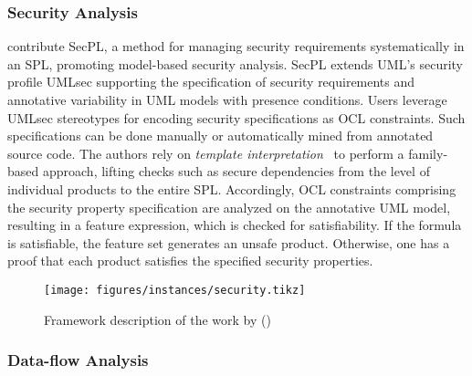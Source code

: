 \subsubsection{Security Analysis}
\label{sec:instance-security}

\citet{securityGPCE18} contribute SecPL, a method for managing security requirements systematically in an SPL, promoting model-based security analysis. SecPL extends UML's security profile UMLsec supporting the specification of security requirements and annotative variability in UML models with presence conditions. Users leverage UMLsec stereotypes for encoding security specifications as OCL constraints. Such specifications can be done manually  or automatically mined from annotated source code. The authors rely on \textit{template interpretation}~\citep{templateInterpretation} to perform a family-based approach, lifting checks such as secure dependencies from the level of individual products to the entire SPL. Accordingly, OCL constraints comprising the security property specification are analyzed on the annotative UML model, resulting in a feature expression, which is checked for satisfiability. If the formula is satisfiable, the feature set generates an unsafe product. Otherwise, one has a proof that each product satisfies the specified security properties.

\begin{figure}[!htbp]
	\centering
        \texttt{[image: figures/instances/security.tikz]}
	\caption{Framework description of the work by \citet{securityGPCE18} ()}
	\label{fig:instance-security}
\end{figure}

\subsubsection{Data-flow Analysis}
\label{sec:instance-spllift}

